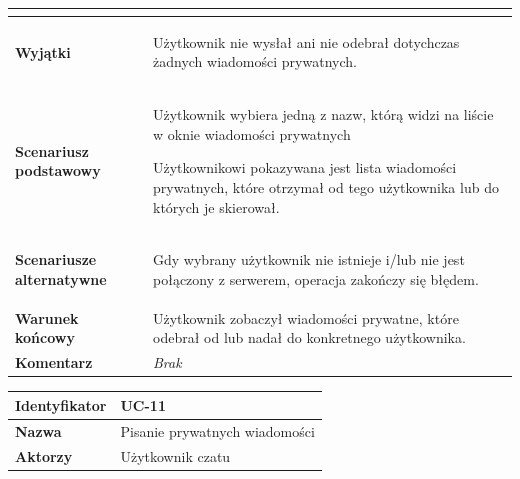 {\begin{tabular}{ | l | l | }
{		}
		\\

	\hline
		\textbf{Wyjątki} & \parbox[t]{11cm}{
		\begin{enumreq}
		 \item Użytkownik nie wysłał ani nie odebrał dotychczas żadnych wiadomości
		 prywatnych.
	 	\end{enumreq}

		}
		\\

	\hline
		\textbf{Scenariusz podstawowy} & \parbox[t]{11cm}{
			\begin{enumreq}
				\item Użytkownik wybiera jedną z nazw, którą widzi na liście w oknie
				wiadomości prywatnych
				\item Użytkownikowi pokazywana jest lista wiadomości prywatnych, które
				otrzymał od tego użytkownika lub do których je skierował.
			\end{enumreq}
		}
		\\

	\hline
		\textbf{Scenariusze alternatywne} & \parbox[t]
		{11cm}{
			\begin{enumreq}
				\item Gdy wybrany użytkownik nie istnieje i/lub nie jest połączony z
				serwerem, operacja zakończy się błędem.
			\end{enumreq}
		}
		\\

	\hline
		\textbf{Warunek końcowy} & \parbox[t]{11cm}{
			Użytkownik zobaczył wiadomości prywatne, które odebrał od lub nadał do
			konkretnego użytkownika.
		}
		\\

	\hline
		\textbf{Komentarz} & \parbox[t]{11cm}{
			\textit{Brak}
		}
		\\

	\hline
\end{tabular}

\vspace{2em}

\begin{tabular}{ | l | l | }
	\hline
		\textbf{Identyfikator} &
		UC-11
		\\

	\hline
		\textbf{Nazwa} &
		Pisanie prywatnych wiadomości
		\\

	\hline
		\textbf{Aktorzy} & \parbox[t]{11cm}{
			Użytkownik czatu
		}\\


\end{tabular}}
